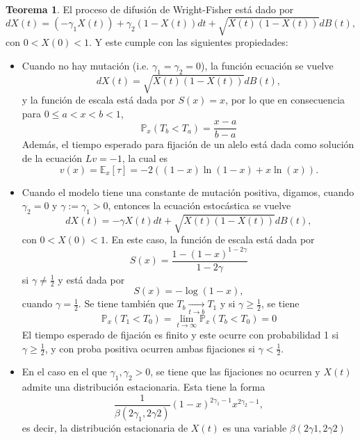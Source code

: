 \documentclass[letterpaper]{article}
\renewcommand{\to}{\rightarrow}
\newcommand{\E}{\mathbb{E}}
\renewcommand{\P}{\mathbb{P}}
\newcommand{\1}{\mathds{1}}
\theoremstyle{definition}
\theoremstyle{definition}
\newtheorem{teo}{Teorema}
\theoremstyle{definition}
\theoremstyle{definition}
\theoremstyle{definition}
\begin{document}
\begin{teo} 
 El proceso de difusión de Wright-Fisher está dado por 
 \[
 dX(t)=(-\gamma_1X(t))+\gamma_2(1-X(t))dt+\sqrt{X(t)(1-X(t))}dB(t),
 \]
 con $0<X(0)<1$. Y este cumple con las siguientes propiedades:
 \begin{itemize}
    \item Cuando no hay mutación (i.e. $\gamma_1=\gamma_2=0$), la función ecuación se vuelve 
    \[
    dX(t)=\sqrt{X(t)(1-X(t))}dB(t),
    \]
    y la función de escala está dada por $S(x)=x$, por lo que en consecuencia para $0\leq a<x<b<1$, 
    \[
    \P_x(T_b<T_a)=\frac{x-a}{b-a}    
    \]
    Además, el tiempo esperado para fijación de un alelo está dada como solución de la ecuación $Lv=-1$, la cual es 
    \[
    v(x)=\E_x\left[\tau\right]=-2((1-x)\ln(1-x)+x\ln(x)).    
    \]
    \item Cuando el modelo tiene una constante de mutación positiva, digamos, cuando $\gamma_2=0$ y $\gamma:=\gamma_1>0$, entonces 
    la ecuación estocástica se vuelve 
    \[
    dX(t)=-\gamma X(t)dt+\sqrt{X(t)(1-X(t))}dB(t),
    \]
    con $0<X(0)<1$. En este caso, la función de escala está dada por 
    \[
    S(x)=\frac{1-(1-x)^{1-2\gamma}}{1-2\gamma}    
    \]
    si $\gamma\neq \frac{1}{2}$ y está dada por 
    \[
    S(x)=-\log(1-x),    
    \]
    cuando $\gamma=\frac{1}{2}$. Se tiene también que $T_b\xrightarrow[t\to b]{}T_1$ y si $\gamma\geq \frac{1}{2}$, se tiene 
    \[
        \P_x\left(T_1<T_0\right)=\lim_{t\to\infty}\P_x(T_b<T_0)=0
    \]
    El tiempo esperado de fijación es finito y este ocurre con probabilidad 1 si $\gamma\geq \frac{1}{2}$, y con proba positiva ocurren ambas
    fijaciones si $\gamma<\frac{1}{2}$.
    \item En el caso en el que $\gamma_1,\gamma_2>0$, se tiene que las fijaciones no ocurren y $X(t)$ admite una distribución estacionaria. Esta 
    tiene la forma 
    \[
    \frac{1}{\beta(2\gamma_1,2\gamma2)}(1-x)^{2\gamma_1-1}x^{2\gamma_2-1},
    \]
    es decir, la distribución estacionaria de $X(t)$ es una variable $\beta(2\gamma1,2\gamma2)$
 \end{itemize}
 \end{teo}
\end{document}
